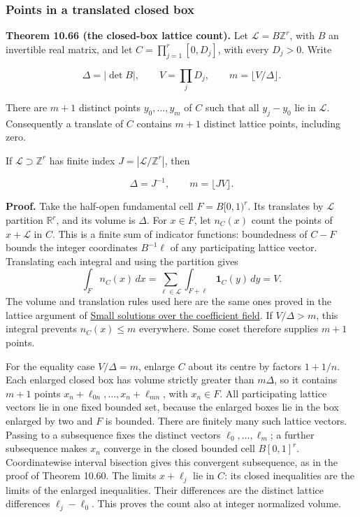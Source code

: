 \documentclass[
  11pt,
  a4paper,
]{article}
\begin{document}
\subsubsection{Points in a translated closed
box}\label{points-in-a-translated-closed-box}

\textbf{Theorem 10.66 (the closed-box lattice count).} Let
\(\mathcal L=B\mathbb Z^r\), with \(B\) an invertible real matrix, and
let \(C=\prod_{j=1}^r[0,D_j]\), with every \(D_j>0\). Write

\[
\Delta=|\det B|,\qquad V=\prod_jD_j,\qquad m=\lfloor V/\Delta\rfloor.
\tag{10.177}
\]

There are \(m+1\) distinct points \(y_0,\ldots,y_m\) of \(C\) such that
all \(y_j-y_0\) lie in \(\mathcal L\). Consequently a translate of \(C\)
contains \(m+1\) distinct lattice points, including zero.

If \(\mathcal L\supset\mathbb Z^r\) has finite index
\(J=|\mathcal L/\mathbb Z^r|\), then

\[
\Delta=J^{-1},\qquad m=\lfloor JV\rfloor.
\tag{10.178}
\]

\textbf{Proof.} Take the half-open fundamental cell \(F=B[0,1)^r\). Its
translates by \(\mathcal L\) partition \(\mathbb R^r\), and its volume
is \(\Delta\). For \(x\in F\), let \(n_C(x)\) count the points of
\(x+\mathcal L\) in \(C\). This is a finite sum of indicator functions:
boundedness of \(C-F\) bounds the integer coordinates \(B^{-1}\ell\) of
any participating lattice vector. Translating each integral and using
the partition gives \[
\int_F n_C(x)\,dx
=\sum_{\ell\in\mathcal L}\int_{F+\ell}\mathbf1_C(y)\,dy
=V.
\] The volume and translation rules used here are the same ones proved
in the lattice argument of
\href{../TR-BAKER-08.html\#small-solutions-over-the-coefficient-field}{Small
solutions over the coefficient field}. If \(V/\Delta>m\), this integral
prevents \(n_C(x)\le m\) everywhere. Some coset therefore supplies
\(m+1\) points.

For the equality case \(V/\Delta=m\), enlarge \(C\) about its centre by
factors \(1+1/n\). Each enlarged closed box has volume strictly greater
than \(m\Delta\), so it contains \(m+1\) points
\(x_n+\ell_{0n},\ldots,x_n+\ell_{mn}\), with \(x_n\in F\). All
participating lattice vectors lie in one fixed bounded set, because the
enlarged boxes lie in the box enlarged by two and \(F\) is bounded.
There are finitely many such lattice vectors. Passing to a subsequence
fixes the distinct vectors \(\ell_0,\ldots,\ell_m\); a further
subsequence makes \(x_n\) converge in the closed bounded cell
\(B[0,1]^r\). Coordinatewise interval bisection gives this convergent
subsequence, as in the proof of Theorem 10.60. The limits \(x+\ell_j\)
lie in \(C\): its closed inequalities are the limits of the enlarged
inequalities. Their differences are the distinct lattice differences
\(\ell_j-\ell_0\). This proves the count also at integer normalized
volume.
\end{document}
